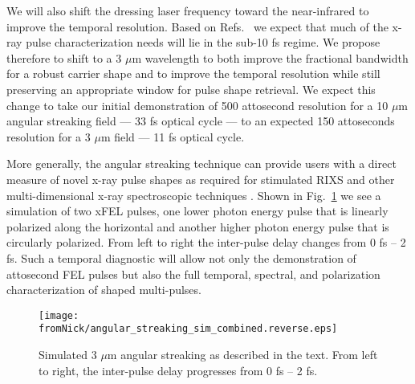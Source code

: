\documentclass[letterpaper,oneside,11pt]{article}
\begin{document}
We will also shift the dressing laser frequency toward the near-infrared to improve the temporal resolution.
Based on Refs.~\cite{lcls2_opportunities,Biggs2012,Mukamel2013} we expect that much of the x-ray pulse characterization needs will lie in the sub-10 fs regime.
We propose therefore to shift to a 3 $\mu$m wavelength to both improve the fractional bandwidth for a robust carrier shape and to improve the temporal resolution while still preserving an appropriate window for pulse shape retrieval.
We expect this change to take our initial demonstration of 500 attosecond resolution for a 10 $\mu$m angular streaking field --- 33 fs optical cycle --- to an expected 150 attoseconds resolution for a 3 $\mu$m field --- 11 fs optical cycle.

More generally, the angular streaking technique can provide users with a direct measure of novel x-ray pulse shapes as required for stimulated RIXS and other multi-dimensional x-ray spectroscopic techniques \cite{Biggs2012,Mukamel2013,4WaveMixing}.
Shown in Fig.~\ref{coffeestains} we see a simulation of two xFEL pulses, one lower photon energy pulse that is linearly polarized along the horizontal and another higher photon energy pulse that is circularly polarized.
From left to right the inter-pulse delay changes from 0 fs -- 2 fs.
Such a temporal diagnostic will allow not only the demonstration of attosecond FEL pulses but also the full temporal, spectral, and polarization characterization of shaped multi-pulses.

\begin{figure}[b]
\vspace{-1.5\baselineskip}
\centerline{
\texttt{[image: fromNick/angular\_streaking\_sim\_combined.reverse.eps]}
}
\vspace{-1.0\baselineskip}
\caption{\label{coffeestains} Simulated 3 $\mu$m angular streaking as described in the text. From left to right, the inter-pulse delay progresses from 0 fs -- 2 fs.}
\end{figure}
\end{document}
